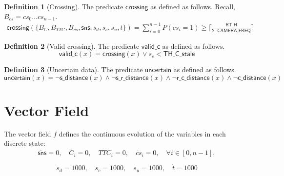 \documentclass[12pt]{article}
\theoremstyle{definition}
\newtheorem{definition}{Definition}[section]
\begin{document}
\begin{definition}[Crossing]
    The predicate $\mathsf{crossing}$ as defined as follows. Recall, $B_{cs} = cs_0 \ldots cs_{n-1}$.
    \[
        \begin{aligned}
            \mathsf{crossing}(\{B_C, B_{TTC}, B_{cs}, \mathsf{sns}, s_d, s_c, s_u, t\}) = \sum_{i=0}^{n-1} P(cs_i = 1) \geq \lceil \frac{\mathsf{RT\_H}}{ 2 \cdot \mathsf{CAMERA\_FREQ}} \rceil
        \end{aligned}
    \]
\end{definition}

\begin{definition}[Valid crossing]
    The predicate $\mathsf{valid\_c}$ as defined as follows.
    \[
        \mathsf{valid\_c}(x) = \mathsf{crossing}(x) \lor s_c < \mathsf{TH\_C\_stale}
    \]
\end{definition}

\begin{definition}[Uncertain data]
    The predicate $\mathsf{uncertain}$ as defined as follows.
    \[
        \mathsf{uncertain}(x) = \neg \mathsf{s\_distance}(x) \land \neg \mathsf{s\_r\_distance}(x) \land \neg \mathsf{r\_c\_distance}(x) \land \neg \mathsf{c\_distance}(x)
    \]
\end{definition}


\section{Vector Field}
The vector field $f$ defines the continuous evolution of the variables in each discrete state: 
\[
\dot{\mathsf{sns}} = 0, \quad \dot{C}_i = 0, \quad \dot{TTC}_i = 0, \quad \dot{cs}_i = 0, \quad \forall i \in [0,n-1], 
\]

\[
\dot{s}_d = 1000, \quad \dot{s}_c = 1000, \quad \dot{s}_u = 1000, \quad \dot{t} = 1000
\]
\end{document}
